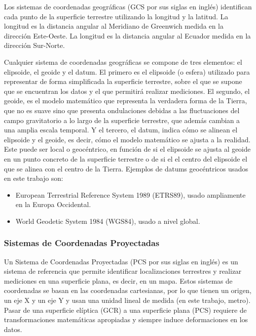 \documentclass[12pt,a4paper,]{book}
\providecommand{\tightlist}{%
  \setlength{\itemsep}{0pt}\setlength{\parskip}{0pt}}
\numberwithin{dummy}{section}
\theoremstyle{ocrenumbox}
\theoremstyle{blacknumex}
\theoremstyle{blacknumbox}
\theoremstyle{ocrenum}
\theoremstyle{ocrenum}
\begin{document}
Los sistemas de coordenadas geográficas (GCS por sus siglas en inglés)
identifican cada punto de la superficie terrestre utilizando la longitud
y la latitud. La longitud es la distancia angular al Meridiano de
Greenwich medida en la dirección Este-Oeste. La longitud es la distancia
angular al Ecuador medida en la dirección Sur-Norte.

Cualquier sistema de coordenadas geográficas se compone de tres
elementos: el elipsoide, el geoide y el datum. El primero es el
elipsoide (o esfera) utilizado para representar de forma simplificada la
superficie terrestre, sobre el que se supone que se encuentran los datos
y el que permitirá realizar mediciones. El segundo, el geoide, es el
modelo matemático que representa la verdadera forma de la Tierra, que no
es suave sino que presenta ondulaciones debidas a las fluctuaciones del
campo gravitatorio a lo largo de la superficie terrestre, que además
cambian a una amplia escala temporal. Y el tercero, el datum, indica
cómo se alinean el elipsoide y el geoide, es decir, cómo el modelo
matemático se ajusta a la realidad. Este puede ser local o geocéntrico,
en función de si el elipsoide se ajusta al geoide en un punto concreto
de la superficie terrestre o de si el el centro del elipsoide el que se
alinea con el centro de la Tierra. Ejemplos de datums geocéntricos
usados en este trabajo son:

\begin{itemize}
\tightlist
\item
  European Terrestrial Reference System 1989 (ETRS89), usado ampliamente
  en la Europa Occidental.
\item
  World Geodetic System 1984 (WGS84), usado a nivel global.
\end{itemize}

\hypertarget{sistemas-de-coordenadas-proyectadas}{%
\subsubsection{Sistemas de Coordenadas
Proyectadas}\label{sistemas-de-coordenadas-proyectadas}}

Un Sistema de Coordenadas Proyectadas (PCS por sus siglas en inglés) es
un sistema de referencia que permite identificar localizaciones
terrestres y realizar mediciones en una superficie plana, es decir, en
un mapa. Estos sistemas de coordenadas se basan en las coordenadas
cartesianas, por lo que tienen un origen, un eje X y un eje Y y usan una
unidad lineal de medida (en este trabajo, metro). Pasar de una
superficie elíptica (GCR) a una superficie plana (PCS) requiere de
transformaciones matemáticas apropiadas y siempre induce deformaciones
en los datos.
\end{document}
